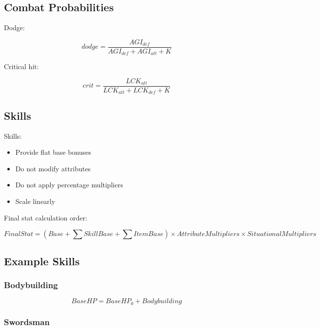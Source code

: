 \subsection{Combat Probabilities}

Dodge:

\begin{equation}
dodge = \frac{AGI_{def}}{AGI_{def} + AGI_{att} + K}
\end{equation}

Critical hit:

\begin{equation}
crit = \frac{LCK_{att}}{LCK_{att} + LCK_{def} + K}
\end{equation}



\subsection{Skills}

Skills:

\begin{itemize}
\item Provide flat base bonuses
\item Do not modify attributes
\item Do not apply percentage multipliers
\item Scale linearly
\end{itemize}

Final stat calculation order:

\begin{equation}
FinalStat =
(Base + \sum SkillBase + \sum ItemBase)
\times AttributeMultipliers
\times SituationalMultipliers
\end{equation}

\subsection{Example Skills}

\subsubsection{Bodybuilding}

\begin{equation}
BaseHP = BaseHP_0 + Bodybuilding
\end{equation}

\subsubsection{Swordsman}

